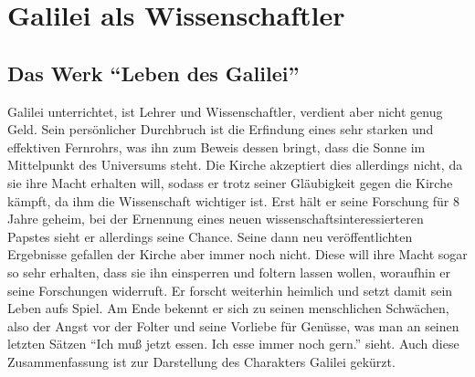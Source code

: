 \documentclass[12pt]{scrreprt}
\begin{document}
\chapter{Galilei als Wissenschaftler}
	\label{chap:galilei als wissenschaftler}
\section{Das Werk \enquote{Leben des Galilei}}
	\label{sec:das werk leben des galilei}
Galilei unterrichtet, ist Lehrer und Wissenschaftler, verdient aber nicht genug Geld.
Sein persönlicher Durchbruch ist die Erfindung eines sehr starken und effektiven Fernrohrs, was ihn zum Beweis dessen bringt, dass die Sonne im Mittelpunkt des Universums steht.
Die Kirche akzeptiert dies allerdings nicht, da sie ihre Macht erhalten will, sodass er trotz seiner Gläubigkeit gegen die Kirche kämpft, da ihm die Wissenschaft wichtiger ist.
Erst hält er seine Forschung für 8 Jahre geheim, bei der Ernennung eines neuen wissenschaftsinteressierteren Papstes sieht er allerdings seine Chance.
Seine dann neu veröffentlichten Ergebnisse gefallen der Kirche aber immer noch nicht.
Diese will ihre Macht sogar so sehr erhalten, dass sie ihn einsperren und foltern lassen wollen, woraufhin er seine Forschungen widerruft.
Er forscht weiterhin heimlich und setzt damit sein Leben aufs Spiel.
Am Ende bekennt er sich zu seinen menschlichen Schwächen, also der Angst vor der Folter und seine Vorliebe für Genüsse, was man an seinen letzten Sätzen \enquote{Ich muß jetzt essen. Ich esse immer noch gern.} sieht.
Auch diese Zusammenfassung ist zur Darstellung des Charakters Galilei gekürzt.
\autocite{wiki:Galilei_Studyflix}
\autocite{wiki:Leben_des_Galilei}
\end{document}
